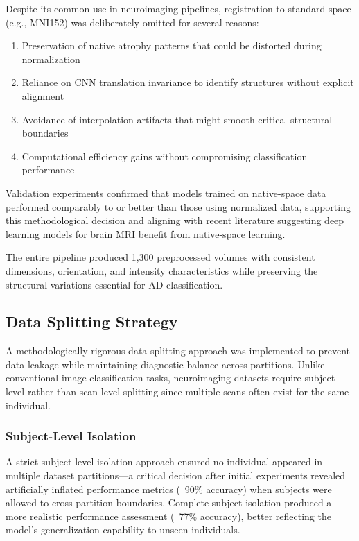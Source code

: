 \documentclass[12pt, a4paper]{article}
\begin{document}
Despite its common use in neuroimaging pipelines, registration to standard space (e.g., MNI152) was deliberately omitted for several reasons:
\begin{enumerate}
    \item Preservation of native atrophy patterns that could be distorted during normalization
    \item Reliance on CNN translation invariance to identify structures without explicit alignment
    \item Avoidance of interpolation artifacts that might smooth critical structural boundaries
    \item Computational efficiency gains without compromising classification performance
\end{enumerate}

Validation experiments confirmed that models trained on native-space data performed comparably to or better than those using normalized data, supporting this methodological decision and aligning with recent literature suggesting deep learning models for brain MRI benefit from native-space learning.

The entire pipeline produced 1,300 preprocessed volumes with consistent dimensions, orientation, and intensity characteristics while preserving the structural variations essential for AD classification.

\subsection{Data Splitting Strategy}

A methodologically rigorous data splitting approach was implemented to prevent data leakage while maintaining diagnostic balance across partitions. Unlike conventional image classification tasks, neuroimaging datasets require subject-level rather than scan-level splitting since multiple scans often exist for the same individual.

\subsubsection{Subject-Level Isolation}

A strict subject-level isolation approach ensured no individual appeared in multiple dataset partitions—a critical decision after initial experiments revealed artificially inflated performance metrics (~90\% accuracy) when subjects were allowed to cross partition boundaries. Complete subject isolation produced a more realistic performance assessment (~77\% accuracy), better reflecting the model's generalization capability to unseen individuals.
\end{document}
